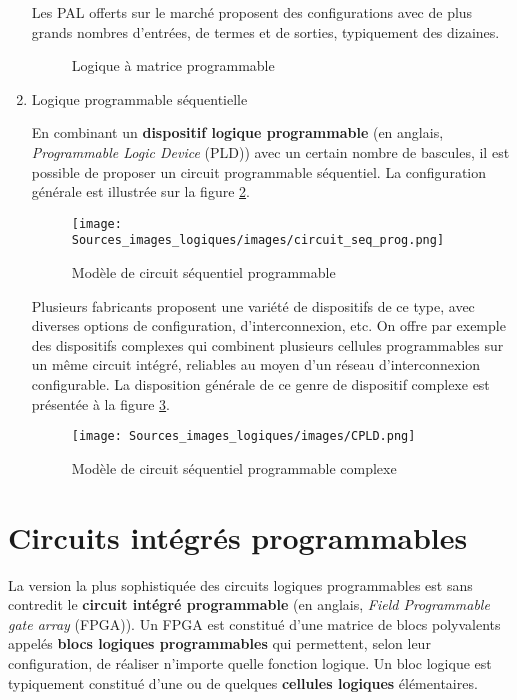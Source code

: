 \documentclass[letter, oneside]{book}
\begin{document}
\begin{enumerate}
Les PAL offerts sur le marché proposent des configurations avec de
plus grands nombres d'entrées, de termes et de sorties, typiquement
des dizaines.


\begin{figure}[htbp]
\centering

\caption{\label{fig:orgf6ca936}Logique à matrice programmable}
\end{figure}

\item Logique programmable séquentielle
\label{sec:org31756a4}

En combinant un \textbf{dispositif logique programmable} (en anglais,
\emph{Programmable Logic Device} (PLD)) avec un certain nombre de
bascules, il est possible de proposer un circuit programmable
séquentiel. La configuration générale est illustrée sur la
figure \ref{fig:orgee93790}.


\begin{figure}[htbp]
\centering
\texttt{[image: Sources\_images\_logiques/images/circuit\_seq\_prog.png]}
\caption{\label{fig:orgee93790}Modèle de circuit séquentiel programmable}
\end{figure} 

Plusieurs fabricants proposent une variété de dispositifs de ce type,
avec diverses options de configuration, d'interconnexion, etc.  On
offre par exemple des dispositifs complexes qui combinent plusieurs
cellules programmables sur un même circuit intégré, reliables au moyen
d'un réseau d'interconnexion configurable. La disposition générale de
ce genre de dispositif complexe est présentée à la figure \ref{fig:org1c3ebf4}.

\begin{figure}[htbp]
\centering
\texttt{[image: Sources\_images\_logiques/images/CPLD.png]}
\caption{\label{fig:org1c3ebf4}Modèle de circuit séquentiel programmable complexe}
\end{figure}
\end{enumerate}

\section{Circuits intégrés programmables}
\label{sec:orgd86f0fa}

La version la plus sophistiquée des circuits logiques programmables
est sans contredit le \textbf{circuit intégré programmable} (en anglais, \emph{Field
Programmable gate array} (FPGA)). Un FPGA est constitué d'une matrice
de blocs polyvalents appelés \textbf{blocs logiques programmables} qui
permettent, selon leur configuration, de réaliser n'importe quelle
fonction logique. Un bloc logique est typiquement constitué d'une ou
de quelques \textbf{cellules logiques} élémentaires.
\end{document}
